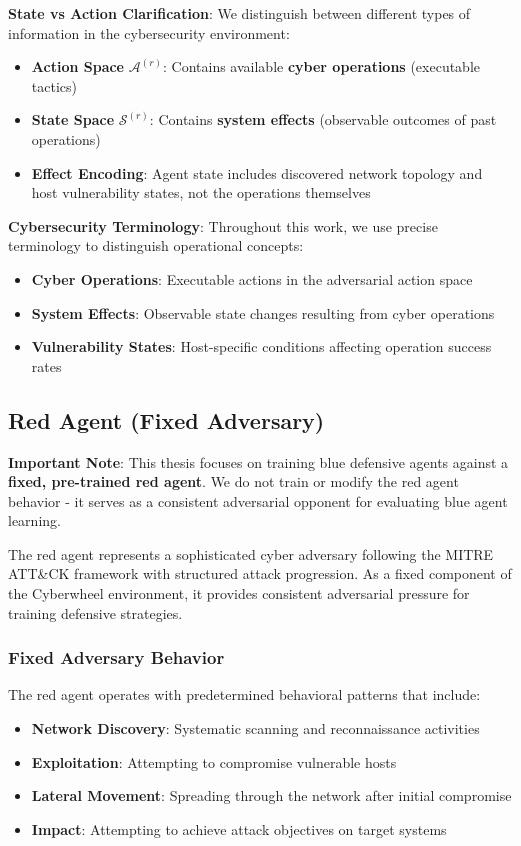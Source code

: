 \documentclass[12pt,oneside,a4paper]{article}
\theoremstyle{definition}
\theoremstyle{plain}
\begin{document}
\textbf{State vs Action Clarification}: We distinguish between different types of information in the cybersecurity environment:
\begin{itemize}
\item \textbf{Action Space} $\mathcal{A}^{(r)}$: Contains available \textbf{cyber operations} (executable tactics)
\item \textbf{State Space} $\mathcal{S}^{(r)}$: Contains \textbf{system effects} (observable outcomes of past operations)  
\item \textbf{Effect Encoding}: Agent state includes discovered network topology and host vulnerability states, not the operations themselves
\end{itemize}

\textbf{Cybersecurity Terminology}: Throughout this work, we use precise terminology to distinguish operational concepts:
\begin{itemize}
\item \textbf{Cyber Operations}: Executable actions in the adversarial action space
\item \textbf{System Effects}: Observable state changes resulting from cyber operations
\item \textbf{Vulnerability States}: Host-specific conditions affecting operation success rates
\end{itemize}

\subsection{Red Agent (Fixed Adversary)}

\textbf{Important Note}: This thesis focuses on training blue defensive agents against a \textbf{fixed, pre-trained red agent}. We do not train or modify the red agent behavior - it serves as a consistent adversarial opponent for evaluating blue agent learning.

The red agent represents a sophisticated cyber adversary following the MITRE ATT\&CK framework with structured attack progression. As a fixed component of the Cyberwheel environment, it provides consistent adversarial pressure for training defensive strategies.

\subsubsection{Fixed Adversary Behavior}
The red agent operates with predetermined behavioral patterns that include:
\begin{itemize}
\item \textbf{Network Discovery}: Systematic scanning and reconnaissance activities
\item \textbf{Exploitation}: Attempting to compromise vulnerable hosts
\item \textbf{Lateral Movement}: Spreading through the network after initial compromise
\item \textbf{Impact}: Attempting to achieve attack objectives on target systems
\end{itemize}
\end{document}
